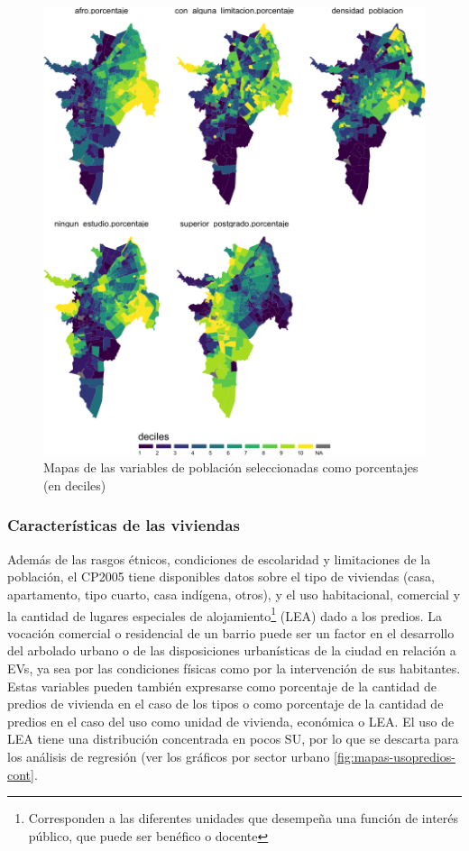 \documentclass[12pt,a4paper,openany]{book}
\let\rmarkdownfootnote\footnote%
\def\footnote{\protect\rmarkdownfootnote}
\theoremstyle{definition}
\theoremstyle{definition}
\theoremstyle{definition}
\theoremstyle{remark}
\begin{document}
\begin{figure}

{\centering \includegraphics[width=1\linewidth]{tesis-unigis_files/figure-latex/mapas-poblacion-mod-deciles-1} 

}

\caption{Mapas de las variables de población seleccionadas como porcentajes (en deciles)}\label{fig:mapas-poblacion-mod-deciles}
\end{figure}

\subsubsection{Características de las
viviendas}\label{caracteristicas-de-las-viviendas}

Además de las rasgos étnicos, condiciones de escolaridad y limitaciones
de la población, el CP2005 tiene disponibles datos sobre el tipo de
viviendas (casa, apartamento, tipo cuarto, casa indígena, otros), y el
uso habitacional, comercial y la cantidad de lugares especiales de
alojamiento\footnote{Corresponden a las diferentes unidades que
  desempeña una función de interés público, que puede ser benéfico o
  docente} (LEA) dado a los predios. La vocación comercial o residencial
de un barrio puede ser un factor en el desarrollo del arbolado urbano o
de las disposiciones urbanísticas de la ciudad en relación a EVs, ya sea
por las condiciones físicas como por la intervención de sus habitantes.
Estas variables pueden también expresarse como porcentaje de la cantidad
de predios de vivienda en el caso de los tipos o como porcentaje de la
cantidad de predios en el caso del uso como unidad de vivienda,
económica o LEA. El uso de LEA tiene una distribución concentrada en
pocos SU, por lo que se descarta para los análisis de regresión (ver los
gráficos por sector urbano \ref{fig:mapas-usopredios-cont}.
\end{document}

